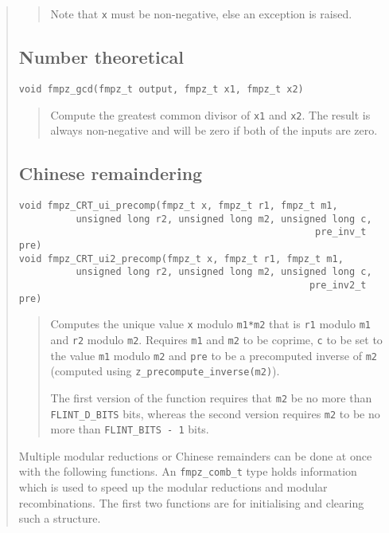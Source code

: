 \documentclass[a4paper,10pt]{article}
\newcommand{\code}{\lstinline}
\begin{document}
\begin{quote}
\begin{quote}
Note that \code{x} must be non-negative, else an exception is raised.
\end{quote}

\subsection{Number theoretical}

\begin{lstlisting}
void fmpz_gcd(fmpz_t output, fmpz_t x1, fmpz_t x2)
\end{lstlisting}
\begin{quote}
Compute the greatest common divisor of \code{x1} and \code{x2}. The result is always non-negative and will be zero if both of the inputs are zero.
\end{quote}

\subsection{Chinese remaindering}
\begin{lstlisting}
void fmpz_CRT_ui_precomp(fmpz_t x, fmpz_t r1, fmpz_t m1, 
          unsigned long r2, unsigned long m2, unsigned long c, 
                                                    pre_inv_t pre)
void fmpz_CRT_ui2_precomp(fmpz_t x, fmpz_t r1, fmpz_t m1, 
          unsigned long r2, unsigned long m2, unsigned long c, 
                                                   pre_inv2_t pre)
\end{lstlisting}
\begin{quote}
Computes the unique value \code{x} modulo \code{m1*m2} that is \code{r1} modulo \code{m1} and \code{r2} modulo \code{m2}. Requires \code{m1} and \code{m2} to be coprime, \code{c} to be set to the value \code{m1} modulo \code{m2} and \code{pre} to be a precomputed inverse of \code{m2} (computed using \code{z_precompute_inverse(m2)}). 

The first version of the function requires that \code{m2} be no more than \code{FLINT_D_BITS} bits, whereas the second version requires \code{m2} to be no more than \code{FLINT_BITS - 1} bits.
\end{quote}

Multiple modular reductions or Chinese remainders can be done at once with the following functions. An \code{fmpz_comb_t} type holds information which is used to speed up the modular reductions and modular recombinations. The first two functions are for initialising and clearing such a structure.


\end{quote}
\end{document}
